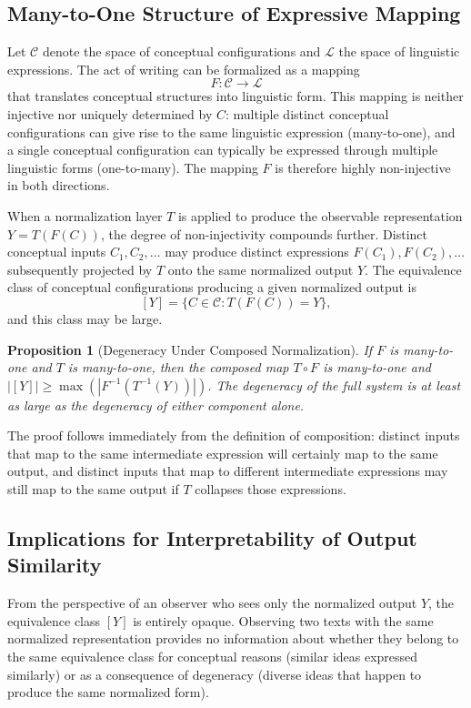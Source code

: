 \documentclass[12pt,a4paper]{article}
\theoremstyle{definition}
\theoremstyle{plain}
\newtheorem{proposition}[definition]{Proposition}
\theoremstyle{remark}
\newcommand{\calL}{\mathcal{L}}
\newcommand{\calC}{\mathcal{C}}
\begin{document}
\subsection{Many-to-One Structure of Expressive Mapping}

Let $\calC$ denote the space of conceptual configurations and $\calL$ the space of linguistic
expressions. The act of writing can be formalized as a mapping
\[
F : \calC \to \calL
\]
that translates conceptual structures into linguistic form. This mapping is neither injective
nor uniquely determined by $C$: multiple distinct conceptual configurations can give rise to
the same linguistic expression (many-to-one), and a single conceptual configuration can
typically be expressed through multiple linguistic forms (one-to-many). The mapping $F$ is
therefore highly non-injective in both directions.

When a normalization layer $T$ is applied to produce the observable representation
$Y = T(F(C))$, the degree of non-injectivity compounds further. Distinct conceptual inputs
$C_1, C_2, \ldots$ may produce distinct expressions $F(C_1), F(C_2), \ldots$
subsequently projected by $T$ onto the same normalized output $Y$. The equivalence
class of conceptual configurations producing a given normalized output is
\[
[Y] = \bigl\{ C \in \calC : T(F(C)) = Y \bigr\},
\]
and this class may be large.

\begin{proposition}[Degeneracy Under Composed Normalization]
\label{prop:degeneracy}
If $F$ is many-to-one and $T$ is many-to-one, then the composed map $T \circ F$ is
many-to-one and $|[Y]| \geq \max\!\left( |F^{-1}(T^{-1}(Y))| \right)$. The degeneracy of
the full system is at least as large as the degeneracy of either component alone.
\end{proposition}

The proof follows immediately from the definition of composition: distinct inputs that map
to the same intermediate expression will certainly map to the same output, and distinct
inputs that map to different intermediate expressions may still map to the same output if $T$
collapses those expressions.

\subsection{Implications for Interpretability of Output Similarity}

From the perspective of an observer who sees only the normalized output $Y$, the equivalence
class $[Y]$ is entirely opaque. Observing two texts with the same normalized representation
provides no information about whether they belong to the same equivalence class for conceptual
reasons (similar ideas expressed similarly) or as a consequence of degeneracy (diverse ideas
that happen to produce the same normalized form).
\end{document}
